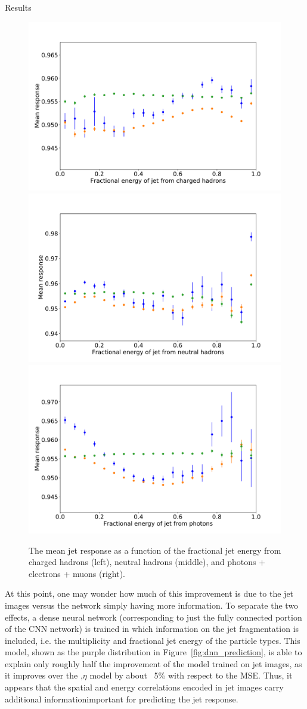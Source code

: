 \begin{section}{Results}
\begin{figure}[tbp!]
\begin{center}
\includegraphics[angle=0,width=0.32\columnwidth]{fig/response_chf.pdf}
\includegraphics[angle=0,width=0.32\columnwidth]{fig/response_nhf.pdf}
\includegraphics[angle=0,width=0.32\columnwidth]{fig/response_phf.pdf}
\end{center}
\caption{The mean jet response as a function of the fractional jet energy from charged hadrons (left), neutral hadrons (middle), and photons + electrons + muons (right).}
\label{fig:response_energyfrac}
\end{figure}

At this point, one may wonder how much of this improvement is due to the jet images versus the network simply having more information.
To separate the two effects, a dense neural network (corresponding to just the fully connected portion of the CNN network) is trained in which information on the jet fragmentation is included, i.e. the multiplicity and fractional jet energy of the particle types.
This model, shown as the purple distribution in Figure~\ref{fig:dnn_prediction}, is able to explain only roughly half the improvement of the model trained on jet images, as it improves over the \pT,$\eta$ model by about ~5\% with respect to the MSE.
Thus, it appears that the spatial and energy correlations encoded in jet images carry additional informationimportant for predicting the jet response.


\end{section}
